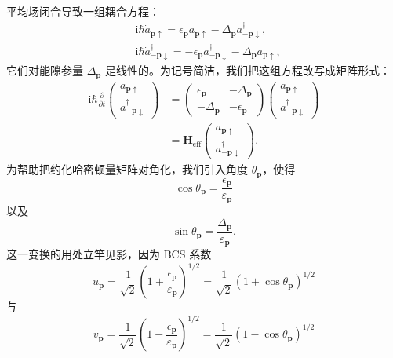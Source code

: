平均场闭合导致一组耦合方程：
\begin{align*}
&\mathrm{i}\hbar\dot{a}_{\mathbf{p}\uparrow}=\epsilon_{\mathbf{p}}a_{\mathbf{p}\uparrow}-\Delta_{\mathbf{p}}a_{-\mathbf{p}\downarrow}^{\dagger},\\
&\mathrm{i}\hbar\dot{a}_{-\mathbf{p}\downarrow}^{\dagger}=-\epsilon_{\mathbf{p}}a_{-\mathbf{p}\downarrow}^{\dagger}-\Delta_{\mathbf{p}}a_{\mathbf{p}\uparrow},\tag{12.228}
\end{align*}
它们对能隙参量 $\Delta_{\mathbf{p}}$ 是线性的。为记号简洁，我们把这组方程改写成矩阵形式：
\begin{align*}
\mathrm{i}\hbar\frac{\partial}{\partial t}\begin{pmatrix}a_{\mathbf{p}\uparrow}\\ a_{-\mathbf{p}\downarrow}^{\dagger}\end{pmatrix}&=\begin{pmatrix}\epsilon_{\mathbf{p}} & -\Delta_{\mathbf{p}}\\ -\Delta_{\mathbf{p}} & -\epsilon_{\mathbf{p}}\end{pmatrix}\begin{pmatrix}a_{\mathbf{p}\uparrow}\\ a_{-\mathbf{p}\downarrow}^{\dagger}\end{pmatrix}\\
&=\mathbf{H}_{\mathrm{eff}}\begin{pmatrix}a_{\mathbf{p}\uparrow}\\ a_{-\mathbf{p}\downarrow}^{\dagger}\end{pmatrix}.\tag{12.229}
\end{align*}
为帮助把约化哈密顿量矩阵对角化，我们引入角度 $\theta_{\mathbf{p}}$，使得
\begin{equation*}
\cos\theta_{\mathbf{p}}=\frac{\epsilon_{\mathbf{p}}}{\varepsilon_{\mathbf{p}}}\tag{12.230}
\end{equation*}
以及
\begin{equation*}
\sin\theta_{\mathbf{p}}=\frac{\Delta_{\mathbf{p}}}{\varepsilon_{\mathbf{p}}}.\tag{12.231}
\end{equation*}
这一变换的用处立竿见影，因为 BCS 系数
\begin{equation*}
u_{\mathbf{p}}=\frac{1}{\sqrt{2}}\left(1+\frac{\epsilon_{\mathbf{p}}}{\varepsilon_{\mathbf{p}}}\right)^{1/2}=\frac{1}{\sqrt{2}}\left(1+\cos\theta_{\mathbf{p}}\right)^{1/2}\tag{12.232}
\end{equation*}
与
\begin{equation*}
v_{\mathbf{p}}=\frac{1}{\sqrt{2}}\left(1-\frac{\epsilon_{\mathbf{p}}}{\varepsilon_{\mathbf{p}}}\right)^{1/2}=\frac{1}{\sqrt{2}}\left(1-\cos\theta_{\mathbf{p}}\right)^{1/2}\tag{12.233}
\end{equation*}
